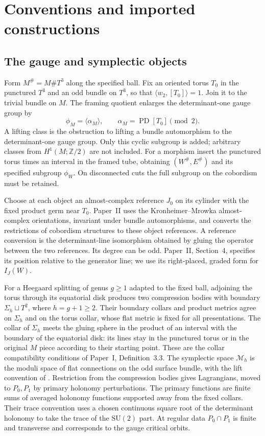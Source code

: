 \documentclass[11pt]{amsart}
\theoremstyle{definition}
\theoremstyle{remark}
\theoremstyle{plain}
\newcommand{\ZZ}{\mathbb Z}
\newcommand{\SU}{\mathrm{SU}}
\newcommand{\PD}{\operatorname{PD}}
\newcommand{\IGJ}{I_J}
\newcommand{\cM}{\mathcal M}
\begin{document}
\section{Conventions and imported constructions}\label{sec:inputs}

\subsection{The gauge and symplectic objects}
Form $M^\#=M\#T^3$ along the specified ball. Fix an oriented torus
$T_0$ in the punctured $T^3$ and an odd bundle on $T^3$, so that
$\langle w_2,[T_0]\rangle=1$. Join it to the trivial bundle on $M$.
The framing quotient enlarges the determinant-one gauge group by
\[
 \phi_M=\langle\alpha_M\rangle,
 \qquad \alpha_M=\PD[T_0]\pmod2.
\]
A lifting class is the obstruction to lifting a bundle automorphism
to the determinant-one gauge group. Only this cyclic subgroup is
added; arbitrary classes from $H^1(M;\ZZ/2)$ are not included.
For a morphism insert the punctured torus times an interval in the
framed tube, obtaining $(W^\#,E^\#)$ and its specified subgroup
$\phi_W$. On disconnected cuts the full subgroup on the cobordism
must be retained.

Choose at each object an almost-complex reference $J_0$ on its
cylinder with the fixed product germ near $T_0$. Paper~II uses the
Kronheimer--Mrowka almost-complex orientations, invariant under
bundle automorphisms, and converts the restrictions of cobordism
structures to these object references. A reference conversion is
the determinant-line isomorphism obtained by gluing the operator
between the two references. Its degree can be odd. Paper~II,
Section~4, specifies its position relative to the generator line;
we use its right-placed, graded form for $\IGJ(W)$.

For a Heegaard splitting of genus $g\ge1$ adapted to the fixed
ball, adjoining the torus through its equatorial disk produces two
compression bodies with boundary $\Sigma_h\sqcup T^2$, where
$h=g+1\ge2$. Their boundary collars and product metrics agree on
$\Sigma_h$ and on the torus collar, whose flat metric is fixed for
all presentations. The collar of $\Sigma_h$ meets the gluing sphere
in the product of an interval with the boundary of the equatorial
disk: its lines stay in the punctured torus or in the original
$M$ piece according to their starting point. These are the collar
compatibility conditions of Paper~I, Definition~3.3.
The symplectic space $\cM_h$ is the moduli space of flat connections
on the odd surface bundle, with the lift convention of
\cite[Section~2]{DFL}. Restriction from the compression bodies gives
Lagrangians, moved to $P_0,P_1$ by primary holonomy perturbations.
The primary functions are finite sums of averaged holonomy functions
supported away from the fixed collars. Their trace convention uses
a chosen continuous square root of the determinant holonomy to take
the trace of the $\SU(2)$ part. At regular data $P_0\cap P_1$ is
finite and transverse and corresponds to the gauge critical orbits.
\end{document}

